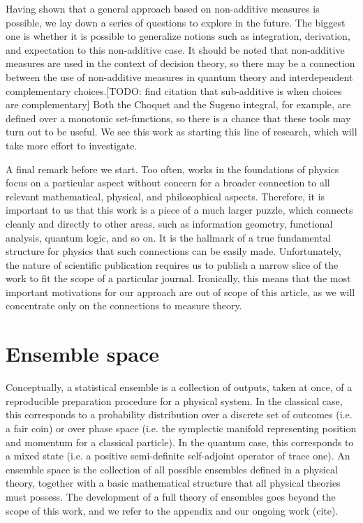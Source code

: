 \documentclass[10pt,twocolumn, nofootinbib]{revtex4-2}
\begin{document}
Having shown that a general approach based on non-additive measures is possible, we lay down a series of questions to explore in the future. The biggest one is whether it is possible to generalize notions such as integration, derivation, and expectation to this non-additive case.  It should be noted that non-additive measures are used in the context of decision theory, so there may be a connection between the use of non-additive measures in quantum theory and interdependent complementary choices.[TODO: find citation that sub-additive is when choices are complementary] Both the Choquet and the Sugeno integral, for example, are defined over a monotonic set-functions, so there is a chance that these tools may turn out to be useful. We see this work as starting this line of research, which will take more effort to investigate.

A final remark before we start. Too often, works in the foundations of physics focus on a particular aspect without concern for a broader connection to all relevant mathematical, physical, and philosophical aspects. Therefore, it is important to us that this work is a piece of a much larger puzzle, which connects cleanly and directly to other areas, such as information geometry, functional analysis, quantum logic, and so on. It is the hallmark of a true fundamental structure for physics that such connections can be easily made. Unfortunately, the nature of scientific publication requires us to publish a narrow slice of the work to fit the scope of a particular journal. Ironically, this means that the most important motivations for our approach are out of scope of this article, as we will concentrate only on the connections to measure theory.

\section{Ensemble space}

Conceptually, a statistical ensemble is a collection of outputs, taken at once, of a reproducible preparation procedure for a physical system. In the classical case, this corresponds to a probability distribution over a discrete set of outcomes (i.e. a fair coin) or over phase space (i.e. the symplectic manifold representing position and momentum for a classical particle). In the quantum case, this corresponds to a mixed state (i.e. a positive semi-definite self-adjoint operator of trace one). An ensemble space is the collection of all possible ensembles defined in a physical theory, together with a basic mathematical structure that all physical theories must possess. The development of a full theory of ensembles goes beyond the scope of this work, and we refer to the appendix and our ongoing work (cite).
\end{document}
